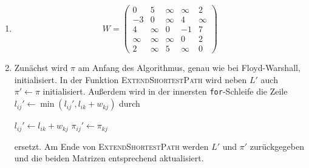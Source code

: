 \documentclass[11pt,a4paper]{article}
\begin{document}
\begin{loesung}
    \begin{enumerate}
        \item
        \begin{equation*}
            W = \begin{pmatrix}
                0 & 5 & \infty & \infty & 2 \\
                -3 & 0 & \infty & 4 & \infty \\
                4 & \infty & 0 & -1 & 7 \\
                \infty & \infty & \infty & 0 & 2 \\
                2 & \infty & 5 & \infty & 0 
            \end{pmatrix}
        \end{equation*}
        \item
        Zunächst wird $\pi$ am Anfang des Algorithmus, genau wie bei Floyd-Warshall, initialisiert.
        In der Funktion \textsc{ExtendShortestPath} wird neben $L'$ auch $\pi' \gets \pi$ initialisiert.
        Außerdem wird in der innersten \texttt{for}-Schleife die Zeile $l_{ij}' \gets \min(l_{ij}', l_{ik} + w_{kj})$ durch
        \begin{algorithmic}
                \State $l_{ij}' \gets l_{ik} + w_{kj}$
                 
                    \State $\pi_{ij}' \gets \pi_{kj}$ 
                \EndIf
            \EndIf
        \end{algorithmic}
        ersetzt.
        Am Ende von \textsc{ExtendShortestPath} werden $L'$ und $\pi'$ zurückgegeben und die beiden Matrizen entsprechend aktualisiert.

\end{enumerate}
\end{loesung}
\end{document}
